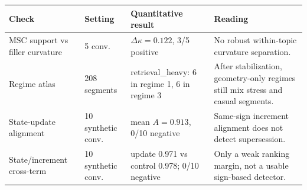 \begin{tabular}{p{2.6cm}p{2.0cm}p{3.0cm}p{2.3cm}}
\toprule
Check & Setting & Quantitative result & Reading \\
\midrule
MSC support vs filler curvature & 5 conv. & $\Delta\kappa=0.122$, 3/5 positive & No robust within-topic curvature separation. \\
Regime atlas & 208 segments & retrieval\_heavy: 6 in regime 1, 6 in regime 3 & After stabilization, geometry-only regimes still mix stress and casual segments. \\
State-update alignment & 10 synthetic conv. & mean $A=0.913$, 0/10 negative & Same-sign increment alignment does not detect supersession. \\
State/increment cross-term & 10 synthetic conv. & update 0.971 vs control 0.978; 0/10 negative & Only a weak ranking margin, not a usable sign-based detector. \\
\bottomrule
\end{tabular}